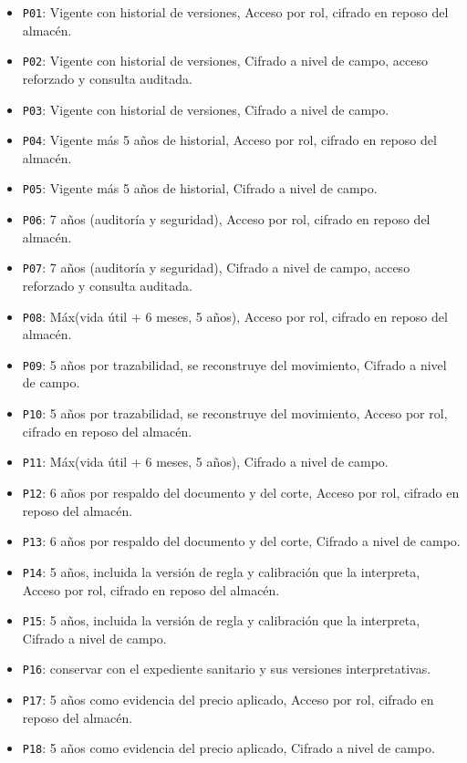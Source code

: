 \begin{itemize}
\item \texttt{P01}: Vigente con historial de versiones, Acceso por rol, cifrado en reposo del almacén.
\item \texttt{P02}: Vigente con historial de versiones, Cifrado a nivel de campo, acceso reforzado y consulta auditada.
\item \texttt{P03}: Vigente con historial de versiones, Cifrado a nivel de campo.
\item \texttt{P04}: Vigente más 5 años de historial, Acceso por rol, cifrado en reposo del almacén.
\item \texttt{P05}: Vigente más 5 años de historial, Cifrado a nivel de campo.
\item \texttt{P06}: 7 años (auditoría y seguridad), Acceso por rol, cifrado en reposo del almacén.
\item \texttt{P07}: 7 años (auditoría y seguridad), Cifrado a nivel de campo, acceso reforzado y consulta auditada.
\item \texttt{P08}: Máx(vida útil + 6 meses, 5 años), Acceso por rol, cifrado en reposo del almacén.
\item \texttt{P09}: 5 años por trazabilidad, se reconstruye del movimiento, Cifrado a nivel de campo.
\item \texttt{P10}: 5 años por trazabilidad, se reconstruye del movimiento, Acceso por rol, cifrado en reposo del almacén.
\item \texttt{P11}: Máx(vida útil + 6 meses, 5 años), Cifrado a nivel de campo.
\item \texttt{P12}: 6 años por respaldo del documento y del corte, Acceso por rol, cifrado en reposo del almacén.
\item \texttt{P13}: 6 años por respaldo del documento y del corte, Cifrado a nivel de campo.
\item \texttt{P14}: 5 años, incluida la versión de regla y calibración que la interpreta, Acceso por rol, cifrado en reposo del almacén.
\item \texttt{P15}: 5 años, incluida la versión de regla y calibración que la interpreta, Cifrado a nivel de campo.
\item \texttt{P16}: conservar con el expediente sanitario y sus versiones interpretativas.
\item \texttt{P17}: 5 años como evidencia del precio aplicado, Acceso por rol, cifrado en reposo del almacén.
\item \texttt{P18}: 5 años como evidencia del precio aplicado, Cifrado a nivel de campo.

\end{itemize}
